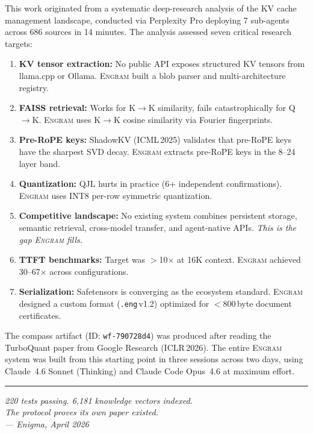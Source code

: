 \documentclass[11pt,twocolumn]{article}
\newcommand{\engram}{\textsc{Engram}}
\begin{document}
This work originated from a systematic deep-research analysis of the KV
cache management landscape, conducted via Perplexity Pro deploying 7
sub-agents across 686 sources in 14 minutes. The analysis assessed seven
critical research targets:

\begin{enumerate}[leftmargin=*,itemsep=1pt]
\item[\textbf{T1.}] \textbf{KV tensor extraction:} No public API
  exposes structured KV tensors from llama.cpp or Ollama. \engram{}
  built a blob parser and multi-architecture registry.

\item[\textbf{T2.}] \textbf{FAISS retrieval:} Works for K$\to$K
  similarity, fails catastrophically for Q$\to$K. \engram{} uses
  K$\to$K cosine similarity via Fourier fingerprints.

\item[\textbf{T3.}] \textbf{Pre-RoPE keys:} ShadowKV (ICML\,2025)
  validates that pre-RoPE keys have the sharpest SVD decay. \engram{}
  extracts pre-RoPE keys in the 8--24 layer band.

\item[\textbf{T4.}] \textbf{Quantization:} QJL hurts in practice
  (6+ independent confirmations). \engram{} uses INT8 per-row symmetric
  quantization.

\item[\textbf{T5.}] \textbf{Competitive landscape:} No existing system
  combines persistent storage, semantic retrieval, cross-model transfer,
  and agent-native APIs. \emph{This is the gap \engram{} fills.}

\item[\textbf{T6.}] \textbf{TTFT benchmarks:} Target was $>$10$\times$
  at 16K context. \engram{} achieved 30--67$\times$ across configurations.

\item[\textbf{T7.}] \textbf{Serialization:} Safetensors is converging
  as the ecosystem standard. \engram{} designed a custom format
  (\texttt{.eng}\,v1.2) optimized for $<$800\,byte document certificates.
\end{enumerate}

The compass artifact (ID: \texttt{wf-790728d4}) was produced after
reading the TurboQuant paper from Google Research (ICLR\,2026). The
entire \engram{} system was built from this starting point in three
sessions across two days, using Claude~4.6 Sonnet (Thinking) and
Claude Code Opus~4.6 at maximum effort.

\vspace{1em}
\noindent\rule{\columnwidth}{0.4pt}
\begin{center}
\small\textit{220 tests passing. 6,181 knowledge vectors indexed.\\
The protocol proves its own paper existed.\\
--- Enigma, April 2026}
\end{center}
\end{document}
